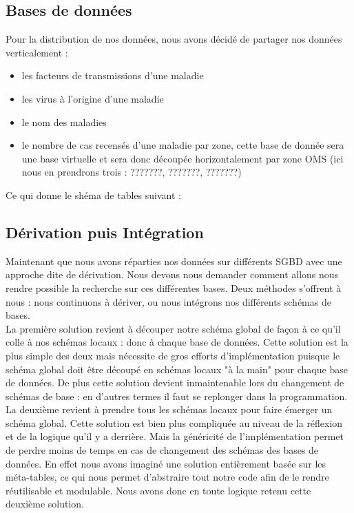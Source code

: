 \documentclass[12pt]{article}
\begin{document}
\subsection{Bases de données}

	Pour la distribution de nos données, nous avons décidé de partager nos données verticalement :\\
	\begin{itemize}
		\item les facteurs de transmissions d'une maladie\\
		\item les virus à l'origine d'une maladie\\
		\item le nom des maladies\\
		\item le nombre de cas recensés d'une maladie par zone, cette base de donnée sera une base virtuelle et sera donc découpée horizontalement par zone OMS (ici nous en prendrons trois : ???????, ???????, ???????)\\
	\end{itemize}
	Ce qui donne le shéma de tables suivant :

\subsection{Dérivation puis Intégration}

	Maintenant que nous avons réparties nos données sur différents SGBD avec une approche dite de dérivation. Nous devons nous demander comment allons nous rendre possible la recherche sur ces différentes bases. Deux méthodes s'offrent à nous : nous continuons à dériver, ou nous intégrons nos différents schémas de bases.\\
	\indent La première solution revient à découper notre schéma global de façon à ce qu'il colle à nos schémas locaux : donc à chaque base de données. Cette solution est la plus simple des deux mais nécessite de gros efforts d'implémentation puisque le schéma global doit être découpé en schémas locaux "à la main" pour chaque base de données. De plus cette solution devient inmaintenable lors du changement de schémas de base : en d'autres termes il faut se replonger dans la programmation.\\
	\indent La deuxième revient à prendre tous les schémas locaux pour faire émerger un schéma global. Cette solution est bien plus compliquée au niveau de la réflexion et de la logique qu'il y a derrière. Mais la généricité de l'implémentation permet de perdre moins de temps en cas de changement des schémas des bases de données. En effet nous avons imaginé une solution entièrement basée sur les méta-tables, ce qui nous permet d'abstraire tout notre code afin de le rendre réutilisable et modulable. Nous avons donc en toute logique retenu cette deuxième solution.\\
\end{document}
